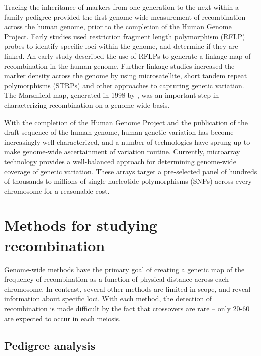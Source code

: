 Tracing the inheritance of markers from one generation to the next within a family pedigree provided the first genome-wide measurement of recombination across the human genome, prior to the completion of the Human Genome Project.
Early studies used restriction fragment length polymorphism (RFLP) probes to identify specific loci within the genome, and determine if they are linked.
An early study described the use of RFLPs to generate a linkage map of recombination in the human genome\cite{Botstein1980}.
Further linkage studies increased the marker density across the genome by using microsatellite, short tandem repeat polymorphisms (STRPs) and other approaches to capturing genetic variation\cite{Morton1991,Matise1994,Dib1996}.
The Marshfield map, generated in 1998 by \citet{Broman1998}, was an important step in characterizing recombination on a genome-wide basis.

With the completion of the Human Genome Project and the publication of the draft sequence of the human genome\cite{Venter2001,Lander2001}, human genetic variation has become increasingly well characterized, and a number of technologies have sprung up to make genome-wide ascertainment of variation routine.
Currently, microarray technology provides a well-balanced approach for determining genome-wide coverage of genetic variation.
These arrays target a pre-selected panel of hundreds of thousands to millions of single-nucleotide polymorphisms (SNPs) across every chromosome for a reasonable cost.

\section{Methods for studying recombination}

Genome-wide methods have the primary goal of creating a genetic map of the frequency of recombination as a function of physical distance across each chromosome.
In contrast, several other methods are limited in scope, and reveal information about specific loci.
With each method, the detection of recombination is made difficult by the fact that crossovers are rare -- only 20-60 are expected to occur in each meiosis.


\subsection{Pedigree analysis}

